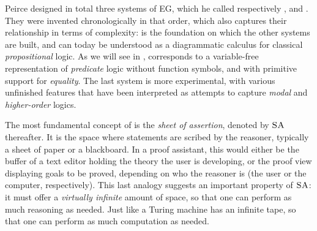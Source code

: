 Peirce designed in total three systems of EG, which he called respectively
,  and . They were invented chronologically in
that order, which also captures their relationship in terms of complexity:
 is the foundation on which the other systems are built, and can
today be understood as a diagrammatic calculus for classical
\emph{propositional} logic. As we will see in ,
 corresponds to a variable-free representation of \emph{predicate}
logic without function symbols, and with primitive support for \emph{equality}.
The last system  is more experimental, with various unfinished
features that have been interpreted as attempts to capture \emph{modal}
 and \emph{higher-order} logics.

The most fundamental concept of  is the \emph{sheet of assertion},
denoted by $\textsc{SA}$ thereafter. It is the space where statements are scribed by the
reasoner, typically a sheet of paper or a blackboard. In a proof assistant, this
would either be the buffer of a text editor holding the theory the user is
developing, or the proof view displaying goals to be proved, depending on who
the reasoner is (the user or the computer, respectively). This last analogy
suggests an important property of $\textsc{SA}$: it must offer a \emph{virtually
infinite} amount of space, so that one can perform as much reasoning as needed.
Just like a Turing machine has an infinite tape, so that one can perform as much
computation as needed.

